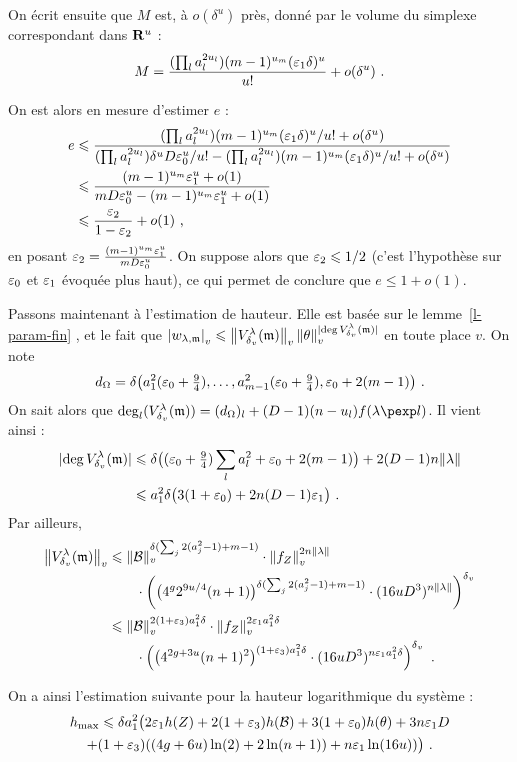 \documentclass[11pt, twoside, a4paper]{article}
\theoremstyle{definition}
\begin{document}
On écrit ensuite que $M$ est, à $o(\delta^u)$ près, donné par le volume du
simplexe correspondant dans $\mathbf{R}^u$ :
\[
  M = \frac{
    (\prod_l a_l^{2u_l}) (m-1)^{u_m} (\varepsilon_1 \delta)^u}{
    u!}
  + o(\delta^u) \text{ .}
\]

On est alors en mesure d'estimer $e$ :
\begin{align*}
  e 
  & \leqslant \frac{
      (\prod_l a_l^{2u_l}) (m-1)^{u_m} (\varepsilon_1 \delta)^u / u! + o(\delta^u)}{
      (\prod_l a_l^{2u_l}) \delta^u D \varepsilon_0^u / u! 
      - (\prod_l a_l^{2u_l}) (m-1)^{u_m} (\varepsilon_1 \delta)^u / u! +o(\delta^u)} \\
  & \leqslant \frac{
      (m-1)^{u_m} \varepsilon_1^u + o(1)}{
      mD\varepsilon_0^u - (m-1)^{u_m} \varepsilon_1^u + o(1)} \\
  & \leqslant \frac {\varepsilon_2} {1 - \varepsilon_2} + o(1) \text{ ,}
\end{align*}
en posant $\varepsilon_2 = \frac {(m-1)^{u_m} \varepsilon_1^u} {m D\varepsilon_0^u}$. On
suppose alors que $\varepsilon_2 \leqslant 1/2$ (c'est l'hypothèse sur $\varepsilon_0$ et $\varepsilon_1$
évoquée plus haut), ce qui permet de conclure que $e \le 1 + o(1)$.

Passons maintenant à l'estimation de hauteur. Elle est basée sur le
lemme~\ref{l-param-fin} , et le fait que $\left\lvert w_{\lambda, {\mathfrak m}}\right\rvert_{v} \leqslant
\left\lVert V_{\delta\smash{_v}}^\lambda({\mathfrak m})\right\rVert_{v} \left\lVert\theta\right\rVert_{v}^{{\lvert\deg V_ {\delta\smash{_v}}^{\lambda}({\mathfrak m})\rvert}}$ en
toute place $v$. On note 
\[
  d_\Omega = \delta \bigl(a_1^2 (\varepsilon_0 + \tfrac94), \ldots, 
  a_{m-1}^2 (\varepsilon_0 + \tfrac94), \varepsilon_0 + 2(m-1) \bigl) \text{ .}
\]
On sait alors que $\deg_l(V_\dv^\lambda(\monome)) = (d_\Omega)_l + 
(D-1) (n-u_l) f(\lambda\pexp l)$. Il vient ainsi :
\begin{align*}
  {\lvert\deg V_ {\delta\smash{_v}}^{\lambda}({\mathfrak m})\rvert} 
  & \leqslant \delta \bigl( (\varepsilon_0 + \tfrac94) \sum_l a_l^2 + \varepsilon_0 + 2(m-1) \bigr)
    + 2(D-1) n\lVert\lambda\rVert \\
  & \leqslant a_1^2 \delta \bigl( 3(1+\varepsilon_0) + 2n (D-1) \varepsilon_1 \bigr) \text{ .}
\end{align*}
Par ailleurs,
\begin{align*}
  \left\lVert V_{\delta\smash{_v}}^\lambda({\mathfrak m})\right\rVert_{v} 
  & \leqslant \left\lVert\mathcal B\right\rVert_{v} ^{\delta(\sum_j 2(a_j^2 -1) + m-1)} \cdot \left\lVert f_Z\right\rVert_{v}^{2n\lVert\lambda\rVert}
    \\ & \qquad \cdot \left( 
    \bigl( 4^g 2^{9u/4} (n+1) \bigr)^{\delta(\sum_j 2(a_j^2-1) + m-1)}
    \cdot (16uD^3)^{n\lVert\lambda\rVert}
    \right)^{\delta\smash{_v}} \\
  & \leqslant \left\lVert\mathcal B\right\rVert_{v} ^{2(1+\varepsilon_3) a_1^2\delta} \cdot \left\lVert f_Z\right\rVert_{v}^{2\varepsilon_1 a_1^2\delta}
    \\ & \qquad \cdot \left(
    \bigl( 4^{2g+3u} (n+1)^2 \bigr)^{(1+\varepsilon_3) a_1^2\delta}
    \cdot (16uD^3)^{n\varepsilon_1 a_1^2\delta}
    \right)^{\delta\smash{_v}} \text{ .}
\end{align*}

On a ainsi l'estimation suivante  pour la hauteur logarithmique du système : 
\begin{multline*}
  h_{\mathrm{max}} \leqslant \delta a_1^2 \bigl( 2\varepsilon_1 h(Z) + 2(1+\varepsilon_3) h(\mathcal B) 
  + 3(1+\varepsilon_0) h(\theta)  + 3n\varepsilon_1D  \\ + (1+\varepsilon_3)((4g+6u)\ln(2)
  + 2\ln(n+1)) + n\varepsilon_1\ln(16u)) \bigr) \text{ .}
\end{multline*}
\end{document}
